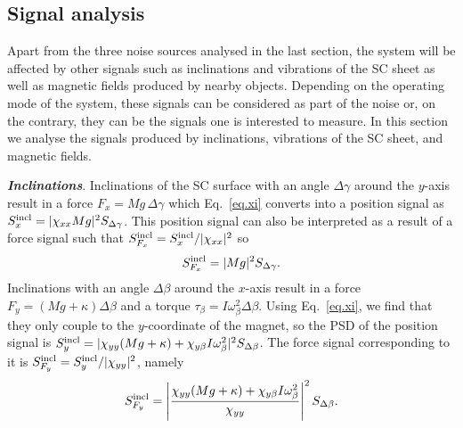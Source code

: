 \documentclass[twocolumn,superscriptaddress,floatfix,preprintnumbers,prl]{revtex4}
\begin{document}
\subsection{Signal analysis}

Apart from the three noise sources analysed in the last section, the system will be affected by other signals such as inclinations and vibrations of the SC sheet as well as magnetic fields produced by nearby objects. Depending on the operating mode of the system, these signals can be considered as part of the noise or, on the contrary, they can be the signals one is interested to measure. 
In this section we analyse the signals produced by inclinations, vibrations of the SC sheet, and magnetic fields.  

\vspace{2mm}

\textbf{\textit{Inclinations}}.
Inclinations of the SC surface with an angle $\Delta \gamma$ around the $y$-axis result in a force $F_x=Mg\,\Delta \gamma$ which Eq.~\eqref{eq.xi} converts into a position signal as $S_{x}^{\rm incl}=|\chi_{xx}M g|^2 S_{\Delta \gamma}$. This position signal can also be interpreted as a result of a force signal such that $S_{F_x}^{\rm incl}=S_{x}^{\rm incl}/|\chi_{xx}|^2$ so  
\begin{equation}
S_{F_x}^{\rm incl}=|M g|^2 S_{\Delta \gamma}.
\end{equation}
Inclinations with an angle $\Delta \beta$ around the $x$-axis result in a force $F_y=(Mg+\kappa)\Delta \beta$ and a torque $\tau_{\beta}=I\omega_{\beta}^2\Delta \beta$. Using Eq.~\eqref{eq.xi}, we find that they only couple to the $y$-coordinate of the magnet, so the PSD of the position signal is $S_{y}^{\rm incl}=|\chi_{yy}(M g+\kappa)+\chi_{y\beta}I\omega_{\beta}^2|^2 S_{\Delta \beta}$. The force signal corresponding to it is $S_{F_y}^{\rm incl}=S_{y}^{\rm incl}/|\chi_{yy}|^2$, namely
\begin{equation}
S_{F_y}^{\rm incl}=\left|\frac{\chi_{yy}(M g+\kappa)+\chi_{y\beta}I\omega_{\beta}^2}{\chi_{yy}} \right|^2 S_{\Delta \beta}.
\end{equation}

\vspace{2mm}
\end{document}
